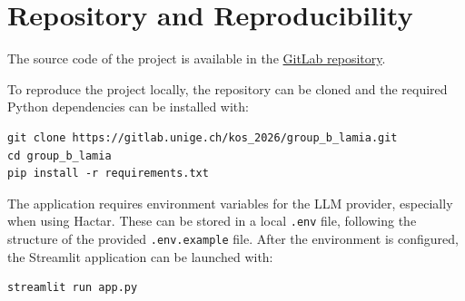 \documentclass[11pt,a4paper]{article}
\begin{document}


\appendix


\section{Repository and Reproducibility}
\label{app:repro}
The source code of the project is available in the 
\href{https://gitlab.unige.ch/kos_2026/group_b_lamia}{GitLab repository}.

To reproduce the project locally, the repository can be cloned and the required Python dependencies can be installed with:

\begin{verbatim}
git clone https://gitlab.unige.ch/kos_2026/group_b_lamia.git
cd group_b_lamia
pip install -r requirements.txt
\end{verbatim}

The application requires environment variables for the LLM provider, especially when using Hactar. These can be stored in a local \texttt{.env} file, following the structure of the provided \texttt{.env.example} file. After the environment is configured, the Streamlit application can be launched with:

\begin{verbatim}
streamlit run app.py
\end{verbatim}
\end{document}
